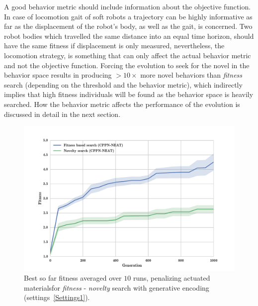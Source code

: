 A good behavior metric should include information about the objective function. In case of locomotion gait of soft robots a trajectory can be highly informative as far as the displacement of the robot's body, as well as the gait, is concerned. Two robot bodies which travelled the same distance into an equal time horizon, should have the same fitness if displacement is only measured, nevertheless, the locomotion strategy, is something that can only affect the actual behavior metric and not the objective function. Forcing the evolution to seek for the novel in the behavior space results in producing $>10 \times$ more novel behaviors than \emph{fitness} search (depending on the threshold and the behavior metric), which  indirectly implies that high fitness individuals will be found as the behavior space is heavily searched. How the behavior metric affects the performance of the evolution is discussed in detail in the next section.

\begin{figure}
\centering
\includegraphics[width=1.0\textwidth]{../Figures/Results/FitNovSize5Pen2.pdf}
\caption[]{Best so far fitness averaged over $10$ runs, penalizing actuated materials\footnotemark for \emph{fitness} - \emph{novelty} search with generative encoding (settings~\ref{Settings1}).}
\label{fig:FitNovSize5Pen2}
\end{figure}



